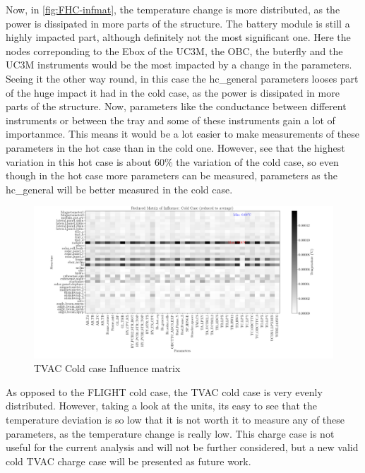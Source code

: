 Now, in \autoref{fig:FHC-infmat}, the temperature change is more distributed, as the power is dissipated in more parts of the structure. The battery module is still a highly impacted part, although definitely not the most significant one. Here the nodes correponding to the Ebox of the UC3M, the OBC, the buterfly and the UC3M instruments would be the most impacted by a change in the parameters. Seeing it the other way round, in this case the hc\_general parameters looses part of the huge impact it had in the cold case, as the power is dissipated in more parts of the structure. Now, parameters like the conductance between different instruments  or between the tray and some of these instruments gain a lot of importanmce. This means it would be a lot easier to make measurements of these parameters in the hot case than in the cold one. However, see that the highest variation in this hot case is about 60\% the variation of the cold case, so even though in the hot case more parameters can be measured, parameters as the hc\_general will be better measured in the cold case.
\begin{figure}[H]
    \centering
    \includegraphics[width = \linewidth]{Figures/UPMSat3/TVAC/Nuevas/infmatCC.png}
    \caption{TVAC Cold case Influence matrix}
    \label{fig:TCC-infmat}
\end{figure}
As opposed to the FLIGHT cold case, the TVAC cold case is very evenly distributed. However, taking a look at the units, its easy to see that the temperature deviation is so low that it is not worth it to measure any of these parameters, as the temperature change is really low. This charge case is not useful for the current analysis and will not be further considered, but a new valid cold TVAC charge case will be presented as future work.
